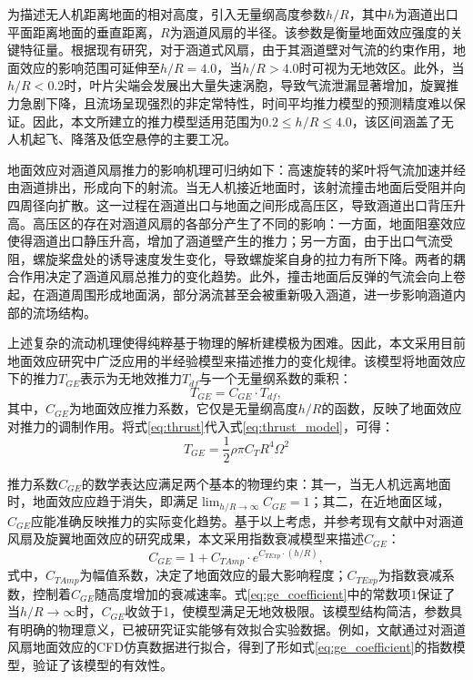 为描述无人机距离地面的相对高度，引入无量纲高度参数$h/R$，其中$h$为涵道出口平面距离地面的垂直距离，$R$为涵道风扇的半径。该参数是衡量地面效应强度的关键特征量。根据现有研究，对于涵道式风扇，由于其涵道壁对气流的约束作用，地面效应的影响范围可延伸至$h/R = 4.0$，当$h/R > 4.0$时可视为无地效区\cite{MI2020105821, matuz2021ground}。此外，当$h/R < 0.2$时，叶片尖端会发展出大量失速涡胞，导致气流泄漏显著增加，旋翼推力急剧下降，且流场呈现强烈的非定常特性，时间平均推力模型的预测精度难以保证\cite{luo2023numerical}。因此，本文所建立的推力模型适用范围为$0.2 \leq h/R \leq 4.0$，该区间涵盖了无人机起飞、降落及低空悬停的主要工况。

地面效应对涵道风扇推力的影响机理可归纳如下：高速旋转的桨叶将气流加速并经由涵道排出，形成向下的射流。当无人机接近地面时，该射流撞击地面后受阻并向四周径向扩散。这一过程在涵道出口与地面之间形成高压区，导致涵道出口背压升高\cite{luo2023numerical, MI2020105821}。高压区的存在对涵道风扇的各部分产生了不同的影响：一方面，地面阻塞效应使得涵道出口静压升高，增加了涵道壁产生的推力；另一方面，由于出口气流受阻，螺旋桨盘处的诱导速度发生变化，导致螺旋桨自身的拉力有所下降\cite{luo2023numerical}。两者的耦合作用决定了涵道风扇总推力的变化趋势。此外，撞击地面后反弹的气流会向上卷起，在涵道周围形成地面涡，部分涡流甚至会被重新吸入涵道，进一步影响涵道内部的流场结构\cite{luo2023numerical}。

上述复杂的流动机理使得纯粹基于物理的解析建模极为困难。因此，本文采用目前地面效应研究中广泛应用的半经验模型来描述推力的变化规律\cite{matuz2021ground}。该模型将地面效应下的推力$T_{GE}$表示为无地效推力$T_{df}$与一个无量纲系数的乘积：
\begin{equation}
    T_{GE} = C_{GE} \cdot T_{df},
\label{eq:thrust_model}
\end{equation}
其中，$C_{GE}$为地面效应推力系数，它仅是无量纲高度$h/R$的函数，反映了地面效应对推力的调制作用。将式\eqref{eq:thrust}代入式\eqref{eq:thrust_model}，可得：
\begin{equation}
    T_{GE} = \frac{1}{2}\rho \pi C_T R^4 \Omega^2
    \label{eq:GE_thrust_model}
\end{equation}

推力系数$C_{GE}$的数学表达应满足两个基本的物理约束：其一，当无人机远离地面时，地面效应应趋于消失，即满足$\lim_{h/R \to \infty} C_{GE} = 1$；其二，在近地面区域，$C_{GE}$应能准确反映推力的实际变化趋势。基于以上考虑，并参考现有文献中对涵道风扇及旋翼地面效应的研究成果\cite{luo2023numerical, MI2020105821, matuz2021ground}，本文采用指数衰减模型来描述$C_{GE}$：
\begin{equation}
C_{GE} = 1 + C_{TAmp} \cdot e^{C_{TExp} \cdot (h/R)},
\label{eq:ge_coefficient}
\end{equation}
式中，$C_{TAmp}$为幅值系数，决定了地面效应的最大影响程度；$C_{TExp}$为指数衰减系数，控制着$C_{GE}$随高度增加的衰减速率。式\eqref{eq:ge_coefficient}中的常数项$1$保证了当$h/R \to \infty$时，$C_{GE}$收敛于1，使模型满足无地效极限。该模型结构简洁，参数具有明确的物理意义，已被研究证实能够有效拟合实验数据\cite{matuz2021ground}。例如，文献\cite{luo2023numerical}通过对涵道风扇地面效应的CFD仿真数据进行拟合，得到了形如式\eqref{eq:ge_coefficient}的指数模型，验证了该模型的有效性。

